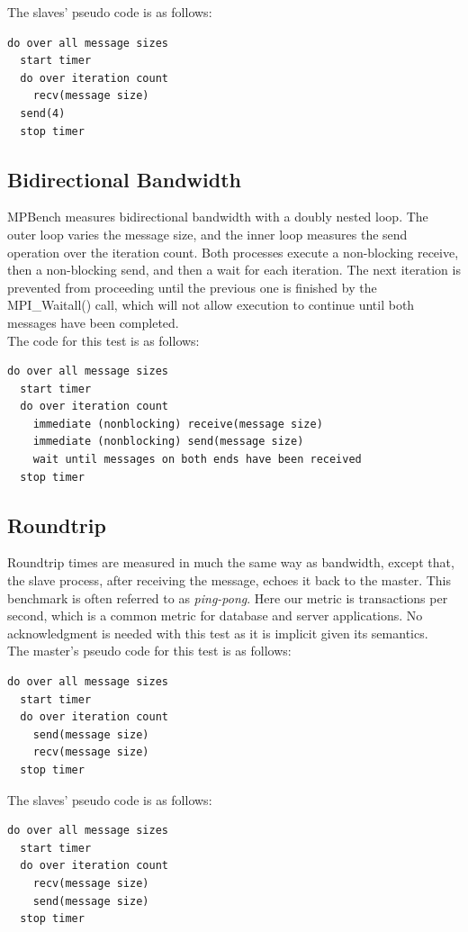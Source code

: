 \documentclass [12pt]{article}
\begin{document}
The slaves' pseudo code is as follows:
\begin{verbatim}
do over all message sizes
  start timer
  do over iteration count
    recv(message size)
  send(4)
  stop timer
\end{verbatim}

\subsection{Bidirectional Bandwidth}

MPBench measures bidirectional bandwidth with a doubly nested loop. The outer loop
varies the message size, and the inner loop measures the send operation
over the iteration count.  Both processes execute a non-blocking receive, then a non-blocking 
send, and then a wait for each iteration.  The next iteration is prevented from proceeding until
the previous one is finished by the MPI\_Waitall() call, which will not allow execution to 
continue until both messages have been completed. \\

The code for this test is as follows:
\begin{verbatim}
do over all message sizes
  start timer
  do over iteration count
    immediate (nonblocking) receive(message size)	
    immediate (nonblocking) send(message size)
    wait until messages on both ends have been received	
  stop timer
\end{verbatim}

\subsection{Roundtrip}

Roundtrip times are measured in much the same way as bandwidth, except
that, the slave process, after receiving the message, echoes it
back to the master. This benchmark is often referred to as {\em
ping-pong}. Here our metric is transactions per second, which is a
common metric for database and server applications. No acknowledgment
is needed with this test as it is implicit given its semantics. \\
\newpage
The master's pseudo code for this test is as follows:
\begin{verbatim}
do over all message sizes
  start timer
  do over iteration count
    send(message size)
    recv(message size)
  stop timer
\end{verbatim}

The slaves' pseudo code is as follows:
\begin{verbatim}
do over all message sizes
  start timer
  do over iteration count
    recv(message size)
    send(message size)
  stop timer
\end{verbatim}
\end{document}
